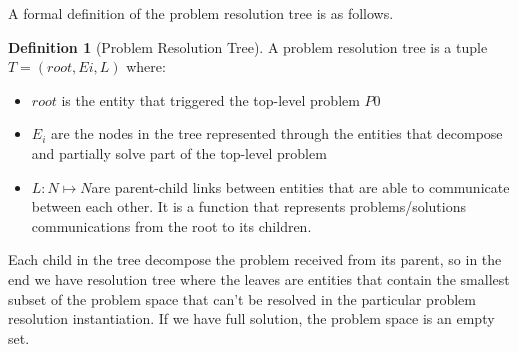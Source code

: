 \documentclass[journal]{IEEEtran}
\theoremstyle{definition}
\newtheorem{definition}{Definition}
\begin{document}
A formal definition of the problem resolution tree is as follows. 

\begin{definition}[Problem Resolution Tree]
A problem resolution tree is a tuple $T = (root, Ei, L) $ where:
\begin{itemize}
\item $root$ is the entity that triggered the top-level problem $P0$
\item $E_i$ are the nodes in the tree represented through the entities that decompose and partially solve part of the top-level problem
\item $L: N \mapsto N $are parent-child links between
entities that are able to communicate between each other. It is a function that represents problems/solutions communications from the root to its children.
\end{itemize}
\end{definition}

Each child in the tree decompose the problem received from its parent, so in the end we have resolution tree where the leaves are entities that contain the smallest subset of the problem space that can't be resolved in the particular problem resolution instantiation. If we have full solution, the problem space is an empty set.




\end{document}
